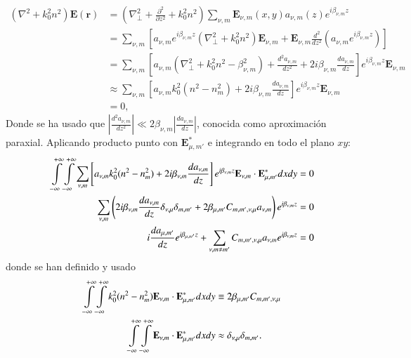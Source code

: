 \begin{align}
	(\nabla^2  + k_0^2n^2) \textbf{E}(\textbf{r}) &= \left(\nabla_\perp^2 + \frac{\partial^2}{\partial z^2} + k_0^2n^2 \right)\sum_{\nu, m} \textbf{E}_{\nu, m}(x, y) a_{\nu, m}(z) e^{i\beta_{\nu, m} z}
	\nonumber
	\\
	&= \sum_{\nu, m} \left[a_{\nu, m} e^{i\beta_{\nu, m} z} \left(\nabla_\perp^2 +k_0^2n^2 \right)\textbf{E}_{\nu, m} + \textbf{E}_{\nu, m}\frac{d^2}{d z^2}\left(a_{\nu, m} e^{i\beta_{\nu, m} z}\right)\right]
	\nonumber	
	\\
	&= \sum_{\nu, m} \left[a_{\nu, m}  \left(\nabla_\perp^2 +k_0^2n^2 -\beta_{\nu,m}^2 \right) + \frac{d^2 a_{\nu, m}}{d z^2}  +2i\beta_{\nu,m}\frac{d a_{\nu, m}}{d z} \right]e^{i\beta_{\nu, m} z}\textbf{E}_{\nu, m}
		\nonumber	
	\\
	&\approx \sum_{\nu, m} \left[a_{\nu, m}  k_0^2(n^2 - n^2_{m}) +2i\beta_{\nu,m}\frac{d a_{\nu, m}}{d z} \right]e^{i\beta_{\nu, m} z}\textbf{E}_{\nu, m}
	\nonumber	
	\\
	&= 0,
	\nonumber	
\end{align}
Donde se ha usado que $\left|\frac{d^2 a_{\nu, m}}{d z^2}\right|\ll 2\beta_{\nu,m}\left|\frac{d a_{\nu, m}}{d z}\right|  $, conocida como aproximación paraxial. Aplicando producto punto con $\textbf{E}_{\mu, m'}^*$ e integrando en todo el plano $xy$:
\begin{align}
	  \int\displaylimits_{-\infty}^{+\infty}\int\displaylimits_{-\infty}^{+\infty} \sum_{\nu, m} \left[a_{\nu, m}  k_0^2(n^2 - n^2_{m}) +2i\beta_{\nu,m}\frac{d a_{\nu, m}}{d z} \right]e^{i\beta_{\nu, m} z}\textbf{E}_{\nu, m} \cdot \textbf{E}_{\mu, m'}^* dxdy &= 0
	  \nonumber
	  \\
	  \sum_{\nu, m} \left(2i\beta_{\nu,m}\frac{d a_{\nu, m}}{d z} \delta_{\nu,\mu}\delta_{m,m'} +  2\beta_{\mu, m'}C_{m, m', \nu, \mu}   a_{\nu, m} \right)e^{i\beta_{\nu, m} z} &= 0
	  \nonumber
	  \\
	  	  i\frac{d a_{\mu, m'}}{d z} e^{i\beta_{\mu, m'} z} +  \sum_{\nu, m\neq m'}C_{m, m', \nu, \mu}   a_{\nu, m} e^{i\beta_{\nu, m} z} &= 0
	\label{eqn:CMT1}
\end{align}
donde se han definido y usado
\begin{align*}
	   \int\displaylimits_{-\infty}^{+\infty}\int\displaylimits_{-\infty}^{+\infty} k_0^2(n^2 - n^2_{m}) \textbf{E}_{\nu, m} \cdot \textbf{E}_{\mu, m'}^* dxdy &\equiv 2\beta_{\mu, m'}C_{m, m', \nu, \mu}  
	\nonumber
	\\
	\int\displaylimits_{-\infty}^{+\infty}\int\displaylimits_{-\infty}^{+\infty} \textbf{E}_{\nu, m} \cdot \textbf{E}_{\mu, m'}^* dxdy &\approx \delta_{\nu,\mu}\delta_{m,m'}.
\end{align*}
